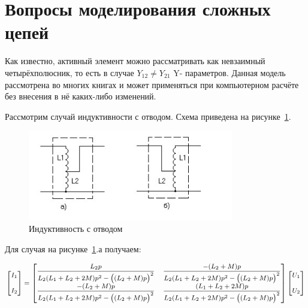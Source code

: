 
\section{Вопросы  моделирования сложных цепей}
 
  
Как  известно,  активный  элемент  можно  рассматривать  как невзаимный  четырёхполюсник, то есть  в  случае  $Y_{12}\ne Y_{21}$  Y-  параметров. 
Данная  модель  рассмотрена  во  многих  книгах  и  может  применяться  при компьютерном  расчёте без внесения в нё каких-либо изменений.
 
 
 Рассмотрим  случай  индуктивности  с  отводом.  Схема  приведена  на 
рисунке~\ref{p:RIs014}. 
 
 
 \begin{figure}[H] \centering
  \includegraphics[width=0.8\textwidth]{./content/RIs014.jpg}
  \caption{Индуктивность с отводом} \label{p:RIs014}
\end{figure}
 
Для случая на рисунке~\ref{p:RIs014}.а получаем: 

\begin{equation}
\label{eq:13}
\footnotesize
\begin{aligned}
\begin{bmatrix} I_{1}\\ \\ I_{2} \end{bmatrix} = 
\begin{bmatrix} \dfrac{L_{2} p}{L_{2}(L_{1} + L_{2} + 2M)p^{2} - \bigl((L_{2} + M)p\bigr)^{2}} &
                           \dfrac{-(L_{2}+M)p}{L_{2}(L_{1} + L_{2} + 2M)p^{2} - \bigl((L_{2} + M)p\bigr)^{2}}\\ 
						      \dfrac{-(L_{2}+M)p}{L_{2}(L_{1} + L_{2} + 2M)p^{2} - \bigl((L_{2} + M)p\bigr)^{2}} &
							  \dfrac{(L_{1}+ L_{2} + 2M)p}{L_{2}(L_{1} + L_{2} + 2M)p^{2} - \bigl((L_{2} + M)p\bigr)^{2}}
\end{bmatrix}
\begin{bmatrix} U_{1}\\ \\  U_{2} \end{bmatrix}
\end{aligned}
\normalsize
\end{equation}


